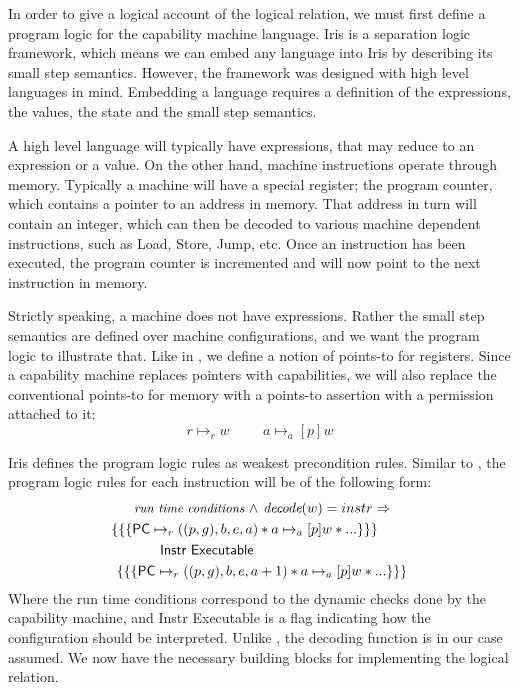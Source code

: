 \documentclass[sigplan,review]{acmart}\settopmatter{printfolios=true,printccs=false,printacmref=false}
\begin{document}
In order to give a logical account of the logical relation, we must first define a program logic for the capability machine language. Iris is a separation logic framework, which means we can embed any language into Iris by describing its small step semantics. However, the framework was designed with high level languages in mind. Embedding a language requires a definition of the expressions, the values, the state and the small step semantics. 

A high level language will typically have expressions, that may reduce to an expression or a value. On the other hand, machine instructions operate through memory. Typically a machine will have a special register; the program counter, which contains a pointer to an address in memory. That address in turn will contain an integer, which can then be decoded to various machine dependent instructions, such as Load, Store, Jump, etc. Once an instruction has been executed, the program counter is incremented and will now point to the next instruction in memory. 

Strictly speaking, a machine does not have expressions. Rather the small step semantics are defined over machine configurations, and we want the program logic to illustrate that. Like in \cite{Jensen:2013}, we define a notion of points-to for registers. Since a capability machine replaces pointers with capabilities, we will also replace the conventional points-to for memory with a points-to assertion with a permission attached to it: 
$$ r \mapsto_r w \hspace{1cm} a \mapsto_a[p] w $$

Iris defines the program logic rules as weakest precondition rules. Similar to \cite{Jensen:2013}, the program logic rules for each instruction will be of the following form: 
\begin{align*}
\small
	\textit{run time conditions } \wedge &\textit{ decode}(w) = instr \Rightarrow  \\
	\{\{\{ \textsf{PC} \mapsto_r ((p,g),b,e,a) &* a \mapsto_a[p] w * ... \}\}\} \\ 
	\textsf{Instr Executable }\\
	\{\{\{\textsf{PC} \mapsto_r ((p,g),b,e,a&+1) * a \mapsto_a[p] w * ... \}\}\}
\end{align*} 
Where the run time conditions correspond to the dynamic checks done by the capability machine, and \textsf{Instr Executable} is a flag  indicating how the configuration should be interpreted. Unlike \cite{Jensen:2013}, the decoding function is in our case assumed. We now have the necessary building blocks for implementing the logical relation. 
\end{document}
